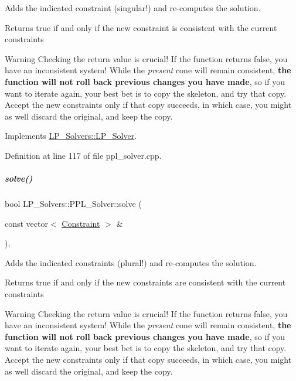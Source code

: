 Adds the indicated constraint (singular!) and re-\/computes the solution. 

\begin{DoxyReturn}{Returns}
{\ttfamily true} if and only if the new constraint is consistent with the current constraints
\end{DoxyReturn}
\begin{DoxyWarning}{Warning}
Checking the return value is crucial! If the function returns {\ttfamily false}, you have an inconsistent system! While the {\itshape present} cone will remain consistent, {\bfseries the function will not roll back previous changes you have made}, so if you want to iterate again, your best bet is to copy the skeleton, and try that copy. Accept the new constraints only if that copy succeeds, in which case, you might as well discard the original, and keep the copy. 
\end{DoxyWarning}


Implements \hyperlink{group___c_l_s_solvers_a8b9979fb228ac9ccfe037ad6ca48b314}{L\+P\+\_\+\+Solvers\+::\+L\+P\+\_\+\+Solver}.



Definition at line 117 of file ppl\+\_\+solver.\+cpp.

\mbox{\label{group___c_l_s_solvers_a3763d4bc551a98546f1f5be4df49390d}} 
\subparagraph{\texorpdfstring{solve()}{solve()}\hspace{0.1cm}{\footnotesize\ttfamily [2/2]}}
{\footnotesize\ttfamily bool L\+P\+\_\+\+Solvers\+::\+P\+P\+L\+\_\+\+Solver\+::solve (\begin{DoxyParamCaption}\item[{const vector$<$ \hyperlink{group___c_l_s_solvers_class_l_p___solvers_1_1_constraint}{Constraint} $>$ \&}]{ }\end{DoxyParamCaption})\hspace{0.3cm}{\ttfamily [override]}, {\ttfamily [virtual]}}



Adds the indicated constraints (plural!) and re-\/computes the solution. 

\begin{DoxyReturn}{Returns}
{\ttfamily true} if and only if the new constraints are consistent with the current constraints
\end{DoxyReturn}
\begin{DoxyWarning}{Warning}
Checking the return value is crucial! If the function returns {\ttfamily false}, you have an inconsistent system! While the {\itshape present} cone will remain consistent, {\bfseries the function will not roll back previous changes you have made}, so if you want to iterate again, your best bet is to copy the skeleton, and try that copy. Accept the new constraints only if that copy succeeds, in which case, you might as well discard the original, and keep the copy. 
\end{DoxyWarning}



